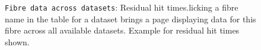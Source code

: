 \documentclass[12pt]{article}
\begin{document}
\begin{figure}
\centering
\noindent{}
  \caption{\centering \texttt{Fibre data across datasets}: Residual hit times.\hspace{\textwidth}licking a fibre name in the table for a dataset brings a page displaying data for this fibre across all available datasets. Example for residual hit times shown.}
  \label{fig:min10}
\end{figure}
\end{document}
